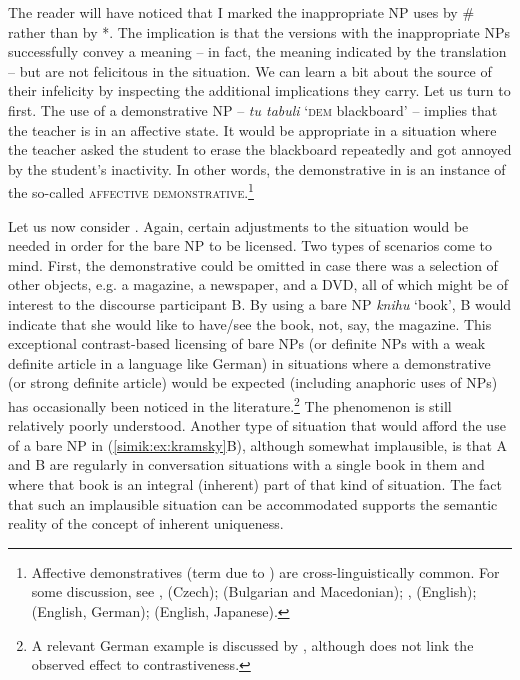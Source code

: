 \documentclass[output=paper,colorlinks,citecolor=brown,newtxmath]{langscibook}
\begin{document}
The reader will have noticed that I marked the inappropriate NP uses by {\#} rather than by *. The implication is that the versions with the inappropriate NPs successfully convey a meaning -- in fact, the meaning indicated by the translation -- but are not felicitous in the situation. We can learn a bit about the source of their infelicity by inspecting the additional implications they carry. Let us turn to  first. The use of a demonstrative NP -- \textit{tu tabuli} `\textsc{dem} blackboard' -- implies that the teacher is in an affective state. It would be appropriate in a situation where the teacher asked the student to erase the blackboard repeatedly and got annoyed by the student's inactivity. In other words, the demonstrative in  is an instance of the so-called \textsc{affective demonstrative}.\footnote{Affective demonstratives (term due to \citealt{Liberman2008}) are cross-linguistically common. For some discussion, see \citet{Mathesius1926}, \citet{Simik2016} (Czech); \citet{Rudin2020} (Bulgarian and Macedonian); \citet{Lakoff1974}, \citet{Liberman2008} (English); \citet{Potts.Schwarz2010} (English, German); \citet{Davis.Potts2010} (English, Japanese).}

Let us now consider . Again, certain adjustments to the situation would be needed in order for the bare NP to be licensed. Two types of scenarios come to mind. First, the demonstrative could be omitted in case there was a selection of other objects, e.g. a magazine, a newspaper, and a DVD, all of which might be of interest to the discourse participant B. By using a bare NP \textit{knihu} `book', B would indicate that she would like to have/see the book, not, say, the magazine. This exceptional contrast-based licensing of bare NPs (or definite NPs with a weak definite article in a language like German) in situations where a demonstrative (or strong definite article) would be expected (including anaphoric uses of NPs) has occasionally been noticed in the literature.\footnote{A relevant German example is discussed by \citet[p. 32, ex. (54)]{Schwarz2009}, although \citeauthor{Schwarz2009} does not link the observed effect to contrastiveness.} The phenomenon is still relatively poorly understood. Another type of situation that would afford the use of a bare NP in (\ref{simik:ex:kramsky}B), although somewhat implausible, is that A and B are regularly in conversation situations with a single book in them and where that book is an integral (inherent) part of that kind of situation. The fact that such an implausible situation can be accommodated supports the semantic reality of the concept of inherent uniqueness.
\end{document}
